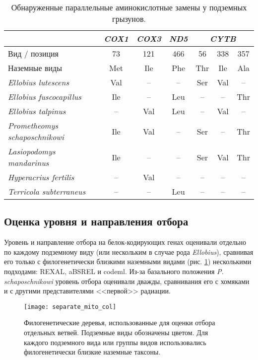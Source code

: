 \begin{table}[h!]
	\caption{Обнаруженные параллельные аминокислотные замены у подземных грызунов.}\label{Underground_subs}
	\vspace{5mm}
\begin{tabular}{|l|c|c|c|c|c|c|}
	\hline
	& \textit{COX1} & \textit{COX3} & \textit{ND5} & \multicolumn{3}{c|}{\textit{CYTB}} \\ \hline
	Вид   / позиция              & 73   & 121  & 466 & 56      & 338    & 357    \\ \hline
	Наземные виды                & Met  & Ile  & Phe & Thr     & Ile    & Ala    \\ \hline
	\textit{Ellobius lutescens}          & Val  & --   & --  & Ser     & Val    & --     \\ \hline
	\textit{Ellobius fuscocapillus}       & Ile  & --   & Leu & --      & --     & Thr    \\ \hline
	\textit{Ellobius talpinus}            & --   & Val  & Leu & --      & Val    & --     \\ \hline
	\textit{Prometheomys schaposchnikowi} & Ile  & Val  & --  & Ser     & --     & Thr    \\ \hline
	\textit{Lasiopodomys mandarinus}      & Ile  & --   & --  & Ser     & Val    & Thr    \\ \hline
	\textit{Hyperacrius fertilis}         & --   & Val  & --  & --      & --     & --     \\ \hline
	\textit{Terricola subterraneus}       & --   & --   & Leu & --      & --     & --     \\ \hline
\end{tabular}	
\end{table}


\subsection{Оценка уровня и направления отбора}

Уровень и направление отбора на белок-кодирующих генах оценивали отдельно по каждому подземному виду (или нескольким в случае рода \textit{Ellobius}), сравнивая его только с филогенетически близкими наземными видами (рис. \ref{tree_mito}) несколькими подходами: REXAL, aBSREL и codeml. Из-за базального положения \textit{P. schaposchnikowi} уровень отбора оценивали дважды, сравнивания его с хомяками и с другими представителями <<первой>> радиации.   

\begin{figure}[h!]
	\begin{center}
		\texttt{[image: separate\_mito\_col]}
	\end{center}
	\caption{Филогенетические деревья, использованные для оценки отбора отдельных ветвей. Подземные виды обозначены цветом. Для каждого подземного вида или группы видов использовались филогенетически близкие наземные таксоны.}
	\label{tree_mito}
\end{figure}


